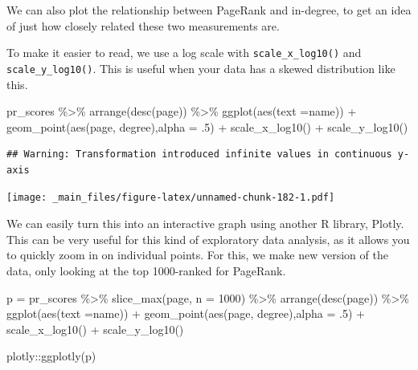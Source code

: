 \documentclass[
]{book}
\newenvironment{Shaded}{\begin{snugshade}}{\end{snugshade}}
\newcommand{\AttributeTok}[1]{\textcolor[rgb]{0.77,0.63,0.00}{#1}}
\newcommand{\DecValTok}[1]{\textcolor[rgb]{0.00,0.00,0.81}{#1}}
\newcommand{\FunctionTok}[1]{\textcolor[rgb]{0.00,0.00,0.00}{#1}}
\newcommand{\NormalTok}[1]{#1}
\newcommand{\OtherTok}[1]{\textcolor[rgb]{0.56,0.35,0.01}{#1}}
\newcommand{\SpecialCharTok}[1]{\textcolor[rgb]{0.00,0.00,0.00}{#1}}
\begin{document}
We can also plot the relationship between PageRank and in-degree, to get an idea of just how closely related these two measurements are.

To make it easier to read, we use a log scale with \texttt{scale\_x\_log10()} and \texttt{scale\_y\_log10()}. This is useful when your data has a skewed distribution like this.

\begin{Shaded}
\begin{Highlighting}[]
\NormalTok{pr\_scores }\SpecialCharTok{\%\textgreater{}\%} 
  \FunctionTok{arrange}\NormalTok{(}\FunctionTok{desc}\NormalTok{(page))  }\SpecialCharTok{\%\textgreater{}\%} 
  \FunctionTok{ggplot}\NormalTok{(}\FunctionTok{aes}\NormalTok{(}\AttributeTok{text =}\NormalTok{name)) }\SpecialCharTok{+} 
  \FunctionTok{geom\_point}\NormalTok{(}\FunctionTok{aes}\NormalTok{(page, degree),}\AttributeTok{alpha =}\NormalTok{ .}\DecValTok{5}\NormalTok{) }\SpecialCharTok{+} \FunctionTok{scale\_x\_log10}\NormalTok{() }\SpecialCharTok{+} \FunctionTok{scale\_y\_log10}\NormalTok{()}
\end{Highlighting}
\end{Shaded}

\begin{verbatim}
## Warning: Transformation introduced infinite values in continuous y-axis
\end{verbatim}

\texttt{[image: \_main\_files/figure-latex/unnamed-chunk-182-1.pdf]}

We can easily turn this into an interactive graph using another R library, Plotly. This can be very useful for this kind of exploratory data analysis, as it allows you to quickly zoom in on individual points. For this, we make new version of the data, only looking at the top 1000-ranked for PageRank.

\begin{Shaded}
\begin{Highlighting}[]
\NormalTok{p }\OtherTok{=}\NormalTok{ pr\_scores }\SpecialCharTok{\%\textgreater{}\%} \FunctionTok{slice\_max}\NormalTok{(page, }\AttributeTok{n =} \DecValTok{1000}\NormalTok{) }\SpecialCharTok{\%\textgreater{}\%} 
  \FunctionTok{arrange}\NormalTok{(}\FunctionTok{desc}\NormalTok{(page))  }\SpecialCharTok{\%\textgreater{}\%} 
  \FunctionTok{ggplot}\NormalTok{(}\FunctionTok{aes}\NormalTok{(}\AttributeTok{text =}\NormalTok{name)) }\SpecialCharTok{+} 
  \FunctionTok{geom\_point}\NormalTok{(}\FunctionTok{aes}\NormalTok{(page, degree),}\AttributeTok{alpha =}\NormalTok{ .}\DecValTok{5}\NormalTok{) }\SpecialCharTok{+} \FunctionTok{scale\_x\_log10}\NormalTok{() }\SpecialCharTok{+} \FunctionTok{scale\_y\_log10}\NormalTok{()}

\NormalTok{plotly}\SpecialCharTok{::}\FunctionTok{ggplotly}\NormalTok{(p)}
\end{Highlighting}
\end{Shaded}
\end{document}
